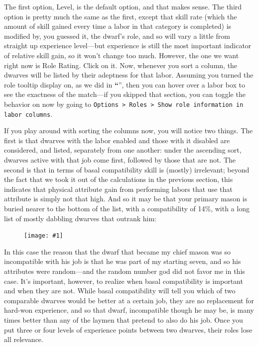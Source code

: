 \documentclass[]{article}
\newcommand{\jump}[1] {\textbf{``\nameref{sec:#1}}''}
\newcommand{\fullfigure}[1] {
\begin{figure}[h!]
\texttt{[image: \#1]}
\end{figure}
}
\begin{document}
The first option, Level, is the default option, and that makes sense. The third option is pretty much the
same as the first, except that skill rate (which the amount of skill gained every time a labor in that
category is completed) is modified by, you guessed it, the dwarf's role, and so will vary a little from
straight up experience level---but experience is still the most important indicator of relative skill
gain, so it won't change too much. However, the one we want right now is Role Rating. Click on it. Now,
whenever you sort a column, the dwarves will be listed by their adeptness for that labor. Assuming you
turned the role tooltip display on, as we did in \jump{Formatting Your Display}, then
you can hover over a labor box to see the exactness of the match---if you skipped that section, you can
toggle the behavior on now by going to \texttt{Options > Roles > Show role information in labor columns}.

If you play around with sorting the columns now, you will notice two things. The first is that dwarves
with the labor enabled and those with it disabled are considered, and listed, separately from one
another: under the ascending sort, dwarves active with that job come first, followed by those that are
not. The second is that in terms of basal compatibility skill is (mostly) irrelevant; beyond the fact
that we took it out of the calculations in the previous section, this indicates that physical attribute
gain from performing labors that use that attribute is simply not that high. And so it may be that your
primary mason is buried nearer to the bottom of the list, with a compatibility of 14\%, with a long list
of mostly dabbling dwarves that outrank him:

\fullfigure{Sec3Fig4}

In this case the reason that the dwarf that became my chief mason was so incompatible with his job is
that he was part of my starting seven, and so his attributes were random---and the random number god did
not favor me in this case. It's important, however, to realize when basal compatibility is important and
when they are not. While basal compatibility will tell you which of two comparable dwarves would be
better at a certain job, they are no replacement for hard-won experience, and so that dwarf, incompatible
though he may be, is many times better than any of the laymen that pretend to also do his job. Once you
put three or four levels of experience points between two dwarves, their roles lose all relevance.
\end{document}
